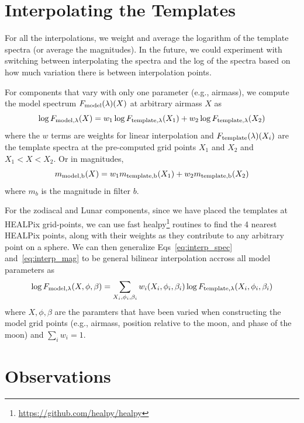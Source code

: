 \documentclass[]{spie}
\begin{document}
\section{Interpolating the Templates}\label{sec:interp}

For all the interpolations, we weight and average the logarithm of the template spectra (or average the magnitudes).  In the future, we could experiment with switching between interpolating the spectra and the log of the spectra based on how much variation there is between interpolation points.  

For components that vary with only one parameter (e.g., airmass), we compute the model spectrum $F_{\rm{model}}(\lambda)(X)$ at arbitrary airmass $X$ as
\begin{equation} \label{eq:interp_spec}
\log{F_{\rm{model},\lambda}(X)} = w_1 \log{F_{\rm{template},\lambda}(X_1)} + w_2\log{F_{\rm{template,\lambda}}(X_2)}
\end{equation}
where the $w$ terms are weights for linear interpolation and $F_{\rm{template}}(\lambda)(X_i)$ are the template spectra at the pre-computed grid points $X_1$ and $X_2$ and $X_1 < X < X_2$.    Or in magnitudes,
\begin{equation}\label{eq:interp_mag}
m_{\rm{model},b}(X) = w_1 m_{\rm{template},b}(X_1) + w_2 m_{\rm{template},b}(X_2)
\end{equation}
where $m_b$ is the magnitude in filter $b$.


For the zodiacal and Lunar components, since we have placed the templates at HEALPix grid-points, we can use fast healpy\footnote{\url{https://github.com/healpy/healpy}} routines to find the 4 nearest HEALPix points, along with their weights as they contribute to any arbitrary point on a sphere.  We can then generalize Eqs~\ref{eq:interp_spec} and~\ref{eq:interp_mag} to be general bilinear interpolation accross all model parameters as
\begin{equation}
\log{F_{\rm{model},\lambda}(X, \phi, \beta)} = \sum_{X_i, \phi_i, \beta_i} w_i(X_i, \phi_i, \beta_i) \log{F_{\rm{template,\lambda}}(X_i, \phi_i, \beta_i)}
\end{equation}
where $X, \phi, \beta$ are the paramters that have been varied when constructing the model grid points (e.g., airmass, position relative to the moon, and phase of the moon) and $\sum_i w_i = 1$. 

\section{Observations}\label{sec:obs}
\end{document}
